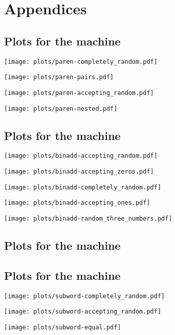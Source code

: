 \section{Appendices}
\subsection{Plots for the  machine}
\label{plots_paren}
\begin{center}\texttt{[image: plots/paren-completely\_random.pdf]}\end{center}
\begin{center}\texttt{[image: plots/paren-pairs.pdf]}\end{center}
\begin{center}\texttt{[image: plots/paren-accepting\_random.pdf]}\end{center}
\begin{center}\texttt{[image: plots/paren-nested.pdf]}\end{center}
\subsection{Plots for the  machine}
\label{plots_binadd}
\begin{center}\texttt{[image: plots/binadd-accepting\_random.pdf]}\end{center}
\begin{center}\texttt{[image: plots/binadd-accepting\_zeros.pdf]}\end{center}
\begin{center}\texttt{[image: plots/binadd-completely\_random.pdf]}\end{center}
\begin{center}\texttt{[image: plots/binadd-accepting\_ones.pdf]}\end{center}
\begin{center}\texttt{[image: plots/binadd-random\_three\_numbers.pdf]}\end{center}
\subsection{Plots for the  machine}
\label{plots_binaryunary}
\subsection{Plots for the  machine}
\label{plots_subword}
\begin{center}\texttt{[image: plots/subword-completely\_random.pdf]}\end{center}
\begin{center}\texttt{[image: plots/subword-accepting\_random.pdf]}\end{center}
\begin{center}\texttt{[image: plots/subword-equal.pdf]}\end{center}

